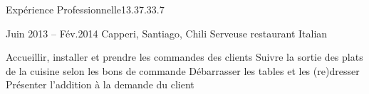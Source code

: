 \documentclass[30pt, french]{tccv}
\begin{document}
\begin{upshape}
\begin{flat_frame}{Expérience Professionnelle}{13.3}{7.3}{3.7}{}
\begin{eventlist}
\setlength{\parskip}{0pt}
\item{\color{text} Juin 2013 -- Fév.2014}
     {Capperi, Santiago, Chili}
     {Serveuse restaurant Italian}
     \fontsize{9pt}{1em}\color{text}\bodyfontlight\upshape\selectfont

    \begin{itemize}
      \cvitem[\checkmark] Accueillir, installer et prendre les commandes des clients
      \cvitem[\checkmark] Suivre la sortie des plats de la cuisine selon les bons de commande
      \cvitem[\checkmark] Débarrasser les tables et les (re)dresser
      \cvitem[\checkmark] Présenter l’addition à la demande du client
      
    \end{itemize}       
  
  
\end{eventlist}
\end{flat_frame}








\end{upshape}
\end{document}
